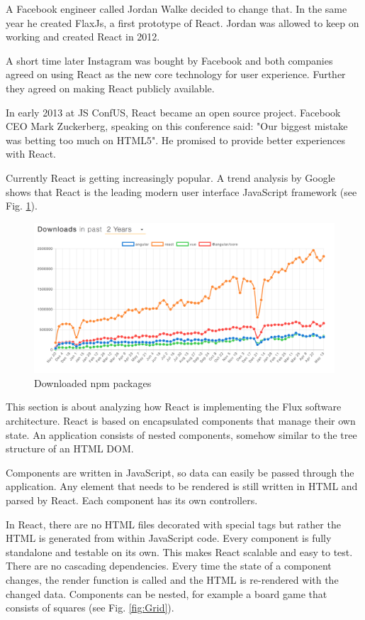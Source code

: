 A Facebook engineer called Jordan Walke decided to change that.
In the same year he created FlaxJs, a first prototype of React. 
Jordan was allowed to keep on working and created React in 2012. 

A short time later Instagram was bought by Facebook and both
companies agreed on using React as the new core technology for user experience.
 Further they agreed on making React publicly available. 

In early 2013 at JS ConfUS, React became an open source project. Facebook CEO Mark Zuckerberg, speaking on this conference said:  "Our biggest mistake was betting too much on HTML5". He promised to provide better experiences with React.

Currently React is getting increasingly popular. A trend analysis by Google shows that 
React is the leading modern user interface JavaScript framework (see Fig. \ref{fig:React}).

\begin{figure}[H]
	\centering
	\includegraphics[scale=0.4]{bilder/grundlagen/ReactDownloads.png}
	\caption{Downloaded npm packages \cite{NPM}}
	\label{fig:React}
\end{figure}

This section is about analyzing how React is implementing the Flux software architecture. 
React is based on encapsulated components that manage their own state.
An application consists of nested components, somehow similar to the tree structure of an HTML DOM.

Components are written in JavaScript, so data can easily be passed through the application.
Any element that needs to be rendered is still written in HTML and parsed by React.
Each component has its own controllers.

In React, there are no HTML files decorated with special tags
but rather the HTML is generated from within JavaScript code.
Every component is fully standalone and testable on its own.
This makes React scalable and easy to test. There are no cascading dependencies.
Every time the state of a component changes,
the render function is called and the HTML is re-rendered with the changed data.
Components can be nested, for example a board game that consists of squares (see Fig. \ref{fig:Grid}).

